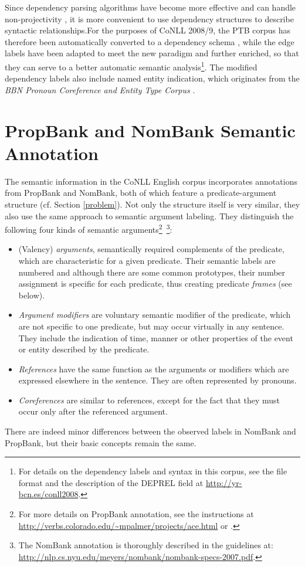 \documentclass[12pt,notitlepage]{report}
\begin{document}
Since dependency parsing algorithms have become more effective and can handle non-projectivity \citep[cf.][]{mcdonald05}, it is more convenient to use dependency structures to describe syntactic relationships.For the purposes of CoNLL 2008/9, the PTB corpus has therefore been automatically converted to a dependency schema \citep{johansson07,surdeanu08}, while the edge labels have been adapted to meet the new paradigm and further enriched, so that they can serve to a better automatic semantic analysis\footnote{For details on the dependency labels and syntax in this corpus, see the file format and the description of the DEPREL field at \url{http://yr-bcn.es/conll2008}.}. The modified dependency labels also include named entity indication, which originates from the \emph{BBN Pronoun Coreference and Entity Type Corpus} \citep{weischedel05}.

\section{PropBank and NomBank Semantic Annotation}

The semantic information in the CoNLL English corpus incorporates annotations from PropBank and NomBank, both of which feature a predicate-argument structure (cf. Section \ref{problem}). Not only the structure itself is very similar, they also use the same approach to semantic argument labeling. They distinguish the following four kinds of semantic arguments\footnote{For more details on PropBank annotation, see the instructions at \url{http://verbs.colorado.edu/~mpalmer/projects/ace.html} or \citep{moreda06}.}~\footnote{The NomBank annotation is thoroughly described in the guidelines at: \\ \url{http://nlp.cs.nyu.edu/meyers/nombank/nombank-specs-2007.pdf}.}:
\begin{itemize} 
    \item (Valency) \emph{arguments}, semantically required complements of the predicate, which are characteristic for a given predicate. Their semantic labels are numbered and although there are some common prototypes, their number assignment is specific for each predicate, thus creating predicate \emph{frames} (see below).
    \item \emph{Argument modifiers} are voluntary semantic modifier of the predicate, which are not specific to one predicate, but may occur virtually in any sentence. They include the indication of time, manner or other properties of the event or entity described by the predicate.
    \item \emph{References} have the same function as the arguments or modifiers which are expressed elsewhere in the sentence. They are often represented by pronouns.
    \item \emph{Coreferences} are similar to references, except for the fact that they must occur only after the referenced argument. %
\end{itemize}
There are indeed minor differences between the observed labels in NomBank and PropBank, but their basic concepts remain the same.
\end{document}
